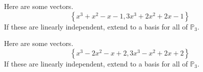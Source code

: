 \documentclass{ximera}
\begin{document}






\begin{problem}\label{prb:10.45} Here are some vectors.
\begin{equation*}
\left\{ x^{3}+x^{2}-x-1,3x^{3}+2x^{2}+2x-1\right\}
\end{equation*}
If these are linearly independent, extend to a basis for all of $\mathbb{P}
_{3}$.
\end{problem}


\begin{problem}\label{prb:10.46} Here are some vectors.
\begin{equation*}
\left\{ x^{3}-2x^{2}-x+2,3x^{3}-x^{2}+2x+2\right\}
\end{equation*}
If these are linearly independent, extend to a basis for all of $\mathbb{P}
_{3}$.
\end{problem}
\end{document}
